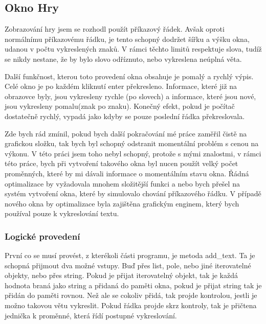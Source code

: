 \documentclass[12pt,a4paper]{article}
\begin{document}
\subsection{Okno Hry}
Zobrazování hry jsem se rozhodl použít příkazový řádek. Avšak oproti normálnímu příkazovému řádku, je tento schopný dodržet šířku a výšku okna, udanou v počtu vykreslených znaků. V rámci těchto limitů respektuje slova, tudíž se nikdy nestane, že by bylo slovo odříznuto, nebo vykreslena neúplná věta.

Další funkčnost, kterou toto provedení okna obsahuje je pomalý a rychlý výpis. Celé okno je po každém kliknutí enter překresleno. Informace, které již na obrazovce byly, jsou vykresleny rychle (po slovech) a informace, které jsou nové, jsou vykresleny pomalu(znak po znaku). Konečný efekt, pokud je počítač dostatečně rychlý, vypadá jako kdyby se pouze poslední řádka překreslovala. 

Zde bych rád zmínil, pokud bych další pokračování mé práce zaměřil čistě na grafickou složku, tak bych byl schopný odstranit momentální problém s cenou na výkonu. V této práci jsem toho nebyl schopný, protože s mými znalostmi, v rámci této práce, bych při vytvoření takového okna byl nucen použít velký počet proměnných, které by mi dávali informace o momentálním stavu okna. Řádná optimalizace by vyžadovala mnohem složitější funkci a nebo bych přešel na systém vytvoření okna, které by simulovalo chování příkazového řádku. V případě nového okna by optimalizace byla zajištěna grafickým enginem, který bych používal pouze k vykreslování textu.
\subsubsection{Logické provedení}
První co se musí provést, z kterékoli části programu, je metoda add\_text. Ta je schopná přijmout dva možné vstupy. Buď přes list, pole, nebo jiné iterovatelné objekty, nebo přes string. Pokud je přijat iterovatelný objekt, tak je každá hodnota braná jako string a přidaná do paměti okna, pokud je přijat string tak je přidán do paměti rovnou. Než ale se cokoliv přidá, tak projde kontrolou, jestli je možno takovou větu vykreslit. Pokud řádka projde skrz kontroly, tak je přičtena jednička k proměnné, která řídí postupné vykreslování.
\end{document}
